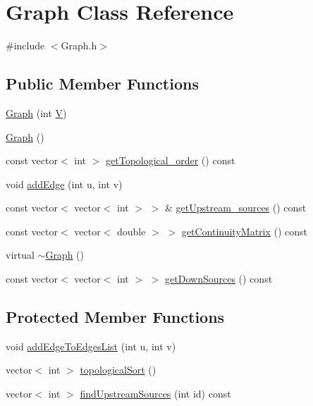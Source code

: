 \hypertarget{classGraph}{}\section{Graph Class Reference}
\label{classGraph}


{\ttfamily \#include $<$Graph.\+h$>$}

\subsection*{Public Member Functions}
\begin{DoxyCompactItemize}
\item 
\mbox{\hyperlink{classGraph_af3ff6b295df8bf3bee0bafd7c7d56915}{Graph}} (int \mbox{\hyperlink{classGraph_a2b722f7cfa7a21e4cb5fae488b3d4dcc}{V}})
\item 
\mbox{\hyperlink{classGraph_ae4c72b8ac4d693c49800a4c7e273654f}{Graph}} ()
\item 
const vector$<$ int $>$ \mbox{\hyperlink{classGraph_a4d531e9313e31e92b9e816bdb5a9d14f}{get\+Topological\+\_\+order}} () const
\item 
void \mbox{\hyperlink{classGraph_ad8c10df34357b2cd865c81e0c4f0bd8c}{add\+Edge}} (int u, int v)
\item 
const vector$<$ vector$<$ int $>$ $>$ \& \mbox{\hyperlink{classGraph_a0d4d0149e7d70bb9e6b7a5cae22062a3}{get\+Upstream\+\_\+sources}} () const
\item 
const vector$<$ vector$<$ double $>$ $>$ \mbox{\hyperlink{classGraph_aa6e27da7010986d54cd2ec79dbbf4abe}{get\+Continuity\+Matrix}} () const
\item 
virtual \mbox{\hyperlink{classGraph_a902c5b3eacb66d60752525ab23297a95}{$\sim$\+Graph}} ()
\item 
const vector$<$ vector$<$ int $>$ $>$ \mbox{\hyperlink{classGraph_a9bbef60829d62f08e802dd1fbda0e4b7}{get\+Down\+Sources}} () const
\end{DoxyCompactItemize}
\subsection*{Protected Member Functions}
\begin{DoxyCompactItemize}
\item 
void \mbox{\hyperlink{classGraph_a6f175234dc3c87150a53eab5c4e586ef}{add\+Edge\+To\+Edges\+List}} (int u, int v)
\item 
vector$<$ int $>$ \mbox{\hyperlink{classGraph_a8f154c485f989828d6fb515a28190ac2}{topological\+Sort}} ()
\item 
vector$<$ int $>$ \mbox{\hyperlink{classGraph_a17fc2fd799b56ac496aa57036f3696d7}{find\+Upstream\+Sources}} (int id) const
\end{DoxyCompactItemize}
